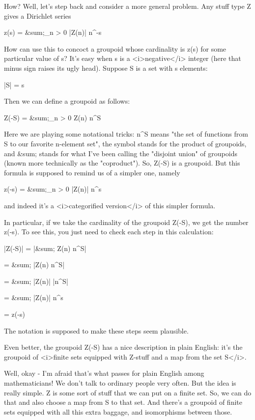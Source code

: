 How?  Well, let's step back and consider a more general problem.  Any
stuff type Z gives a Dirichlet series

z(s) = &sum;_{n > 0} |Z(n)| n^{-s}

How can use this to concoct a groupoid whose cardinality is z(s) for
some particular value of s?  It's easy when s is a <i>negative</i>
integer (here that minus sign raises its ugly head).  Suppose S is a
set with s elements:

|S| = s

Then we can define a groupoid as follows:

Z(-S) = &sum;_{n > 0} Z(n) \times  n^{S}

Here we are playing some notational tricks: n^{S} means "the
set of functions from S to our favorite n-element set", the symbol
\times  stands for the product of groupoids, and &sum; stands for what
I've been calling the "disjoint union" of groupoids (known more
technically as the "coproduct").  So, Z(-S) is a groupoid.  But this
formula is supposed to remind us of a simpler one, namely

z(-s) = &sum;_{n > 0} |Z(n)| n^{s}

and indeed it's a <i>categorified version</i> of this simpler formula.  

In particular, if we take the cardinality of the groupoid Z(-S), we
get the number z(-s).  To see this, you just need to check each step
in this calculation:

|Z(-S)| = |&sum; Z(n) \times  n^{S}|

= &sum; |Z(n) \times  n^{S}|

= &sum; |Z(n)| \times  |n^{S}|

= &sum; |Z(n)| \times  n^{s}

= z(-s)

The notation is supposed to make these steps seem plausible.  

Even better, the groupoid Z(-S) has a nice description in plain
English: it's the groupoid of <i>finite sets equipped with Z-stuff and
a map from the set S</i>.

Well, okay - I'm afraid that's what passes for plain English among
mathematicians!  We don't talk to ordinary people very often.  But the
idea is really simple.  Z is some sort of stuff that we can put on a
finite set.  So, we can do that and also choose a map from S to that
set.  And there's a groupoid of finite sets equipped with all this
extra baggage, and isomorphisms between those.

